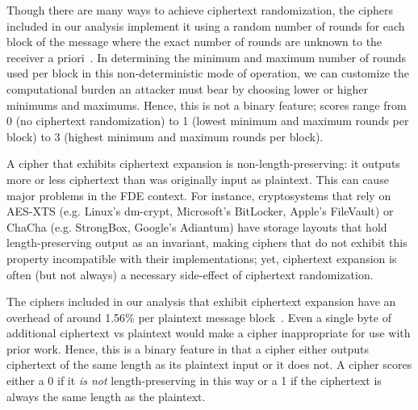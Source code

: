 Though there are many ways to achieve ciphertext randomization, the ciphers
included in our analysis implement it using a random number of rounds for each
block of the message where the exact number of rounds are unknown to the
receiver a priori~\cite{Freestyle}. In determining the minimum and maximum
number of rounds used per block in this non-deterministic mode of operation, we
can customize the computational burden an attacker must bear by choosing lower
or higher minimums and maximums. Hence, this is not a binary feature; scores
range from 0 (no ciphertext randomization) to 1 (lowest minimum and maximum
rounds per block) to 3 (highest minimum and maximum rounds per block).


 A cipher that exhibits ciphertext
expansion is non-length-preserving: it outputs more or less ciphertext than was
originally input as plaintext. This can cause major problems in the FDE context.
For instance, cryptosystems that rely on AES-XTS (e.g. Linux's dm-crypt,
Microsoft's BitLocker, Apple's FileVault) or ChaCha (e.g. StrongBox, Google's
Adiantum) have storage layouts that hold length-preserving output as an
invariant, making ciphers that do not exhibit this property incompatible with
their implementations; yet, ciphertext expansion is often (but not always) a
necessary side-effect of ciphertext randomization.

The ciphers included in our analysis that exhibit ciphertext expansion have an
overhead of around 1.56\% per plaintext message block~\cite{Freestyle}. Even a
single byte of additional ciphertext vs plaintext would make a cipher
inappropriate for use with prior work. Hence, this is a binary feature in that a
cipher either outputs ciphertext of the same length as its plaintext input or it
does not. A cipher scores either a 0 if it \emph{is not} length-preserving in
this way or a 1 if the ciphertext is always the same length as the plaintext.


